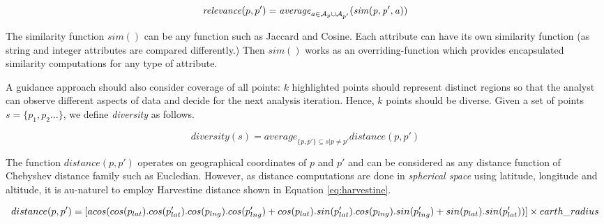 
\begin{dmath}
\label{eq:rel}
\mathit{relevance}(p,p') = \mathit{average}_{a \in {\cal A}_{p} \cup {\cal A}_{p'}}(\mathit{sim(p, p', a)})
\end{dmath}

The similarity function $\mathit{sim}()$ can be any function such as Jaccard and Cosine. Each attribute can have its own similarity function (as string and integer attributes are compared differently.) Then $\mathit{sim}()$ works as an overriding-function which provides encapsulated similarity computations for any type of attribute.

\vspace{5pt}
 A guidance approach should also consider coverage of all points: $k$ highlighted points should represent distinct regions so that the analyst can observe different aspects of data and decide for the next analysis iteration. Hence, $k$ points should be diverse.
Given a set of points $s = \{ p_1, p_2 \dots \}$, we define {\em diversity} as follows.

\begin{dmath}
\label{eq:divs}
\mathit{diversity}(s) = \mathit{average}_{\{p, p'\} \subseteq s | p \neq p' } \mathit{distance}(p,p')
\end{dmath} 

The function $\mathit{distance}(p,p')$ operates on geographical coordinates of $p$ and $p'$ and can be considered as any distance function of Chebyshev distance family such as Eucledian. However, as distance computations are done in {\em spherical space} using latitude, longitude and altitude, it is au-naturel to employ Harvestine distance shown in Equation \ref{eq:harvestine}.

\begin{dmath}
\label{eq:harvestine}
distance(p,p') = [ acos(cos(p_{lat}) . cos(p'_{lat}) . cos(p_{lng}) . cos(p'_{lng})\\ + cos(p_{lat}) . sin(p'_{lat}). cos(p_{lng}) . sin(p'_{lng}) + sin(p_{lat}) . sin(p'_{lat})) ] \times earth\_radius
\end{dmath}

